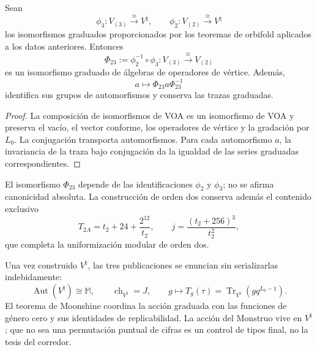 \begin{theorem}
\label{thm:cierre-vtm-equivalencia-voa-23}
Sean
\[
 \phi_3:V_{(3)}\xrightarrow{\ \cong\ }V^\natural,
 \qquad
 \phi_2:V_{(2)}\xrightarrow{\ \cong\ }V^\natural
\]
los isomorfismos graduados proporcionados por los teoremas de orbifold
aplicados a los datos anteriores. Entonces
\[
 \boxed{\Phi_{23}:=\phi_2^{-1}\circ\phi_3:
 V_{(3)}\xrightarrow{\ \cong\ }V_{(2)}}
\]
es un isomorfismo graduado de álgebras de operadores de vértice. Además,
\[
 a\longmapsto\Phi_{23}a\Phi_{23}^{-1}
\]
identifica sus grupos de automorfismos y conserva las trazas graduadas.
\end{theorem}

\begin{proof}
La composición de isomorfismos de VOA es un isomorfismo de VOA y preserva el
vacío, el vector conforme, los operadores de vértice y la gradación por
\(L_0\). La conjugación transporta automorfismos. Para cada automorfismo
\(a\), la invariancia de la traza bajo conjugación da la igualdad de las
series graduadas correspondientes.
\end{proof}

El isomorfismo \(\Phi_{23}\) depende de las identificaciones \(\phi_2\) y
\(\phi_3\); no se afirma canonicidad absoluta. La construcción de orden dos
conserva además el contenido exclusivo
\[
 T_{2A}=t_2+24+\frac{2^{12}}{t_2},
 \qquad
 \boxed{j=\frac{(t_2+256)^3}{t_2^2}},
\]
que completa la uniformización modular de orden dos.

Una vez construido \(V^\natural\), las tres publicaciones se enuncian sin
serializarlas indebidamente:
\[
 \operatorname{Aut}(V^\natural)\cong\mathbb M,
 \qquad
 \operatorname{ch}_{V^\natural}=J,
 \qquad
 g\longmapsto T_g(\tau)
 =\operatorname{Tr}_{V^\natural}\!\left(gq^{L_0-1}\right).
\]
El teorema de Moonshine coordina la acción graduada con las funciones de
género cero y sus identidades de replicabilidad. La acción del Monstruo vive
en \(V^\natural\); que no sea una permutación puntual de cifras es un control
de tipos final, no la tesis del corredor.

